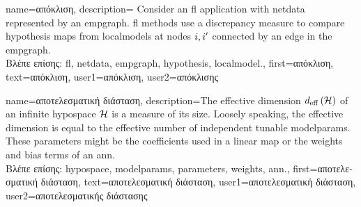 {name={\foreignlanguage{greek}{απόκλιση}},
	description={
		Consider an \gls{fl} application with \gls{netdata} 
		represented by an \gls{empgraph}. \gls{fl} methods use a discrepancy measure 
		to compare \gls{hypothesis} maps from \gls{localmodel}s at nodes $i,i'$ 
		connected by an edge in the \gls{empgraph}.\\
		\foreignlanguage{greek}{Βλέπε επίσης:} \gls{fl}, \gls{netdata}, \gls{empgraph}, \gls{hypothesis}, \gls{localmodel}.},
	first={\foreignlanguage{greek}{απόκλιση}},
	text={\foreignlanguage{greek}{απόκλιση}},
	user1={\foreignlanguage{greek}{απόκλιση}}, %
	user2={\foreignlanguage{greek}{απόκλισης}} %
}


{name={\foreignlanguage{greek}{αποτελεσματική διάσταση}},
	description={The effective dimension $d_{\rm eff} \left( \mathcal{H} \right)$ of 
		an infinite \gls{hypospace} $\mathcal{H}$ is a measure of its size. Loosely speaking, the 
		effective dimension is equal to the effective number of independent tunable \gls{modelparams}. 
		These \gls{parameters} might be the coefficients used in a linear map or the 
		\gls{weights} and bias terms of an \gls{ann}.\\
		\foreignlanguage{greek}{Βλέπε επίσης:} \gls{hypospace}, \gls{modelparams}, \gls{parameters}, \gls{weights}, \gls{ann}.},
	first={\foreignlanguage{greek}{αποτελεσματική διάσταση}},
	text={\foreignlanguage{greek}{αποτελεσματική διάσταση}},
	user1={\foreignlanguage{greek}{αποτελεσματική διάσταση}}, %
	user2={\foreignlanguage{greek}{αποτελεσματικής διάστασης}} %
}


